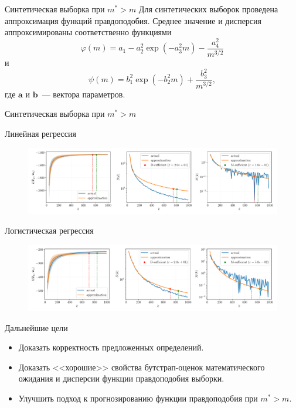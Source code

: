 \documentclass{beamer}
\begin{document}
\begin{frame}{Синтетическая выборка при $m^* > m$}
    Для синтетических выборок проведена аппроксимация функций правдоподобия. Среднее значение и дисперсия аппроксимированы соответственно функциями
    \[ \varphi(m) = a_1 - a_2^2 \exp\left( - a_3^2 m \right) - \dfrac{a_4^2}{m^{3/2}} \]
    и
    \[ \psi(m) = b_1^2 \exp\left( - b_2^2 m \right) + \dfrac{b_3^2}{m^{3/2}}, \]
    где $\mathbf{a}$ и $\mathbf{b}$~--- вектора параметров.
\end{frame}
\begin{frame}{Синтетическая выборка при $m^* > m$}
    \begin{center}
        Линейная регрессия
    \end{center}
    \begin{figure}[h!]
        \centering
        \includegraphics[width=\textwidth]{paper/figures/synthetic-regression-approximation.pdf}
        \label{synthetic-regression-approximation}
    \end{figure}
    \vspace{-1cm}
    \begin{center}
        Логистическая регрессия
    \end{center}
    \begin{figure}[h!]
        \centering
        \includegraphics[width=\textwidth]{paper/figures/synthetic-classification-approximation.pdf}
        \label{synthetic-classification-approximation}
    \end{figure}
\end{frame}
\begin{frame}{Дальнейшие цели}
    \begin{itemize}
        \item Доказать корректность предложенных определений.
        \item Доказать <<хорошие>> свойства бутстрап-оценок математического ожидания и дисперсии функции правдоподобия выборки.
        \item Улучшить подход к прогнозированию функции правдоподобия при $m^* > m$.
    \end{itemize}
\end{frame}
\end{document}
